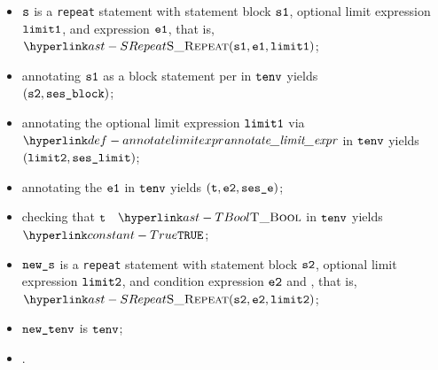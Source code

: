 \ProseParagraph
\AllApply
\begin{itemize}
  \item $\vs$ is a \texttt{repeat} statement with statement block $\vsone$,
        optional limit expression $\vlimitone$, and expression $\veone$, that is, $\SRepeat(\vsone, \veone, \vlimitone)$;
  \item annotating $\vsone$ as a block statement per  in $\tenv$ yields \\
        $(\vstwo, \vsesblock)$\ProseOrTypeError;
  \item annotating the optional limit expression $\vlimitone$ via $\annotatelimitexpr$ in $\tenv$ yields $(\vlimittwo, \vseslimit)$\ProseOrTypeError;
  \item annotating the \rhsexpression{} $\veone$ in $\tenv$ yields $(\vt, \vetwo, \vsese)$\ProseOrTypeError;
  \item checking that $\vt$ \typesatisfiesterm\ $\TBool$ in $\tenv$ yields $\True$\ProseOrTypeError;
  \item $\news$ is a \texttt{repeat} statement with statement block $\vstwo$, optional limit expression $\vlimittwo$,
        and condition expression $\vetwo$ and , that is, $\SRepeat(\vstwo, \vetwo, \vlimittwo)$;
  \item $\newtenv$ is $\tenv$;
  \item {}.
\end{itemize}
\FormallyParagraph
\begin{mathpar}
\end{mathpar}

